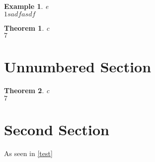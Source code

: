 \documentclass[10pt,a4paper,draft]{report}
\newtheorem{theorem}{Theorem}
\newtheorem{example}{Example}[theorem]
\begin{document}
	\begin{example}{e}
		\\$1sadfasdf$
	\end{example}

	\begin{theorem}{c}
		\\$7$
	\end{theorem}
	
	\section{Unnumbered Section}
	
	\begin{theorem}{c}
		\\$7$
	\end{theorem}
	
	\section{Second Section}
	
	As seen in \ref{test}
	
\end{document}
